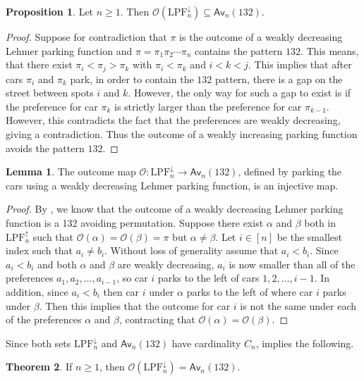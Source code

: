 \documentclass{amsart}
\newcommand{\Av}{\mathsf{Av}}
\newcommand{\IT}{\mathrm{LPF}}
\newcommand{\Out}{\mathcal{O}}
\theoremstyle{definition}
\newtheorem{theorem}{Theorem}[section]
\newtheorem{proposition}{Proposition}[section]
\newtheorem{lemma}[theorem]{Lemma}
\theoremstyle{definition}
\theoremstyle{remark}
\begin{document}
\begin{proposition}\label{thm:cat}
    Let $n\geq 1$. Then $\Out(\IT_n^\downarrow)\subseteq\Av_n(132)$.
\end{proposition}
\begin{proof}
    Suppose for contradiction that $\pi$ is the outcome of a weakly decreasing Lehmer parking function and $\pi=\pi_1\pi_2\cdots\pi_n$ contains the pattern $132$. 
    This means, that there exist $\pi_i<\pi_j>\pi_k$ with $\pi_i<\pi_k$ and $i<k<j$.
This implies that after cars $\pi_i$ and $\pi_k$ park, in order to contain the $132$ pattern, there is a gap on the street between spots $i$ and $k$. 
However, the only way for such a gap to exist is if the preference for car $\pi_k$ is strictly larger than the preference for car $\pi_{k-1}$. However, this contradicts the fact that the preferences are weakly decreasing, giving a contradiction. Thus the outcome of a weakly increasing parking function avoids the pattern $132$. 
\end{proof}


\begin{lemma}\label{lem:injective}
The outcome map $\Out: \IT_n^\downarrow\to \Av_n(132)$, defined by parking the cars using a weakly decreasing Lehmer parking function, is an injective map. 
\end{lemma}
\begin{proof}
By , we know that the outcome of a weakly decreasing Lehmer parking function is a 132 avoiding permutation.
Suppose there exist $\alpha$ and $\beta$ both in $\IT_n^\uparrow$ such that $\Out(\alpha)=\Out(\beta)=\pi$ but $\alpha\neq\beta$.
Let $i\in[n]$ be the smallest index such that $a_i\neq b_i$.
Without loss of generality assume that $a_i<b_i$. 
Since $a_i<b_i$ and both $\alpha$ and $\beta$ are weakly decreasing, $a_i$ is now smaller than all of the preferences $a_1,a_2,\ldots,a_{i-1}$,  so car $i$ parks to the left of cars $1,2,\ldots,i-1$. In addition, since $a_i<b_i$ then car $i$ under $\alpha$ parks to the left of where car $i$ parks under $\beta$.
Then this implies that the outcome for car $i$ is not the same under each of the preferences $\alpha$ and $\beta$, contracting that $\Out(\alpha)=\Out(\beta)$.
\end{proof}

Since both  sets $\IT_n^\downarrow$ and $\Av_n(132)$ have cardinality $C_n$,   implies the following.

\begin{theorem}\label{thm:weakly_dec_lehmer}
If $n\geq 1$, then $\Out(\IT_n^\downarrow)=\Av_n(132)$.    
\end{theorem}





\end{document}
